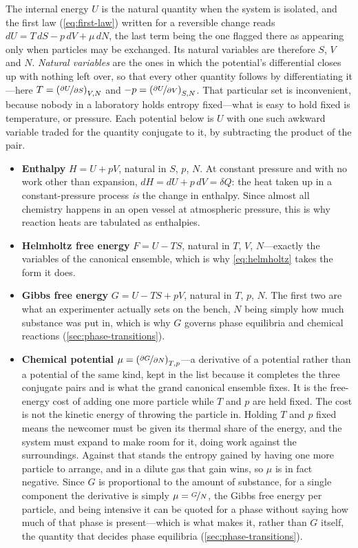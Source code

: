         The internal energy $U$ is the natural quantity when the system is isolated, and the first law (\cref{eq:first-law}) written for a reversible change reads $dU = T\,dS - p\,dV + \mu\,dN$, the last term being the one flagged there as appearing only when particles may be exchanged. Its natural variables are therefore $S$, $V$ and $N$. \emph{Natural variables} are the ones in which the potential's differential closes up with nothing left over, so that every other quantity follows by differentiating it---here $T = \left(\nicefrac{\partial U}{\partial S}\right)_{V,N}$ and $-p = \left(\nicefrac{\partial U}{\partial V}\right)_{S,N}$. That particular set is inconvenient, because nobody in a laboratory holds entropy fixed---what is easy to hold fixed is temperature, or pressure. Each potential below is $U$ with one such awkward variable traded for the quantity conjugate to it, by subtracting the product of the pair.

        \begin{itemize}
            \item \textbf{Enthalpy} $H = U + pV$, natural in $S$, $p$, $N$. At constant pressure and with no work other than expansion, $dH = dU + p\,dV = \delta Q$: the heat taken up in a constant-pressure process \emph{is} the change in enthalpy. Since almost all chemistry happens in an open vessel at atmospheric pressure, this is why reaction heats are tabulated as enthalpies.
            \item \textbf{Helmholtz free energy} $F = U - TS$, natural in $T$, $V$, $N$---exactly the variables of the canonical ensemble, which is why \cref{eq:helmholtz} takes the form it does.
            \item \textbf{Gibbs free energy} $G = U - TS + pV$, natural in $T$, $p$, $N$. The first two are what an experimenter actually sets on the bench, $N$ being simply how much substance was put in, which is why $G$ governs phase equilibria and chemical reactions (\cref{sec:phase-transitions}).
            \item \textbf{Chemical potential} $\mu = \left(\nicefrac{\partial G}{\partial N}\right)_{T,p}$---a derivative of a potential rather than a potential of the same kind, kept in the list because it completes the three conjugate pairs and is what the grand canonical ensemble fixes. It is the free-energy cost of adding one more particle while $T$ and $p$ are held fixed. The cost is not the kinetic energy of throwing the particle in. Holding $T$ and $p$ fixed means the newcomer must be given its thermal share of the energy, and the system must expand to make room for it, doing work against the surroundings. Against that stands the entropy gained by having one more particle to arrange, and in a dilute gas that gain wins, so $\mu$ is in fact negative. Since $G$ is proportional to the amount of substance, for a single component the derivative is simply $\mu = \nicefrac{G}{N}$, the Gibbs free energy per particle, and being intensive it can be quoted for a phase without saying how much of that phase is present---which is what makes it, rather than $G$ itself, the quantity that decides phase equilibria (\cref{sec:phase-transitions}).
        \end{itemize}

